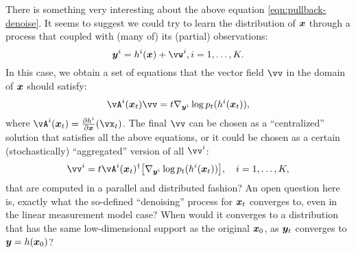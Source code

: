 \documentclass[../../book-main.tex]{subfiles}
\begin{document}
\begin{remark}
{There is something very interesting about the above equation \eqref{eqn:pullback-denoise}. It seems to suggest we could try to learn the distribution of $\bm{x}$ through a process that coupled with (many of) its (partial) observations:
\begin{equation}
\y^i = h^i(\x) +\vw^i, i =1, \ldots, K.
\end{equation} In this case, we obtain a set of equations that the vector field $\vv$ in the domain of $\bm{x}$ should satisfy:
\begin{equation}
    \vA^i(\x_t) \vv = t \nabla_{\y^i} \log p_t(h^i(\x_t)),
\label{eqn:federated-pushforward}
\end{equation}
where $\vA^i(\x_t) = \frac{\partial h^i}{\partial \x}(\vx_t)$. The final $\vv$ can be chosen as a ``centralized'' solution that satisfies all the above equations, or it could be chosen as a certain (stochastically) ``aggregated'' version of all $\vv^i$:
\begin{equation}
    \vv^i = t\vA^i(\x_t)^\dagger \big[\nabla_{\y^i} \log p_t(h^i(\x_t))\big], \quad i = 1, \ldots, K,
\end{equation}
that are computed in a parallel and distributed fashion? An open question here is, exactly what the so-defined ``denoising'' process for $\bm{x}_t$ converges to, even in the linear measurement model case? When would it converges to a  distribution that has the same low-dimensional support as the original $\bm{x}_0$, as $\bm{y}_t$ converges to $\bm{y} = h(\bm{x}_0)$? }
\end{remark}

\end{document}
